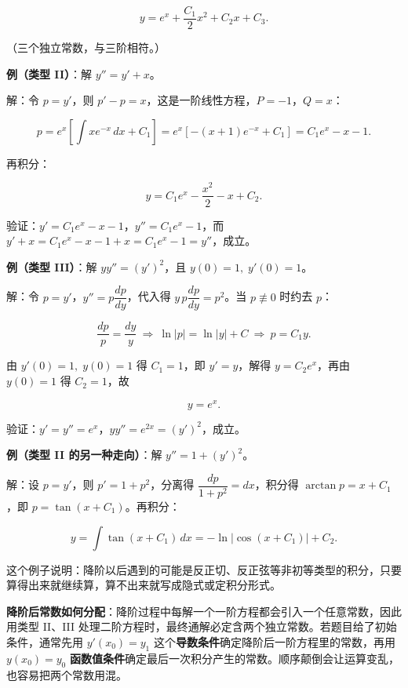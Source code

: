 \documentclass[11pt,openany,UTF8]{ctexbook}
\begin{document}
\[y=e^{x}+\frac{C_1}{2}x^{2}+C_2x+C_3 .\]

（三个独立常数，与三阶相符。）

\textbf{例（类型 II）}：解 $y''=y'+x$。

解：令 $p=y'$，则 $p'-p=x$，这是一阶线性方程，$P=-1$，$Q=x$：

\[p=e^{x}\left[\int xe^{-x}\,dx+C_1\right]=e^{x}\left[-(x+1)e^{-x}+C_1\right]=C_1e^{x}-x-1 .\]

再积分：

\[y=C_1e^{x}-\frac{x^{2}}{2}-x+C_2 .\]

验证：$y'=C_1e^{x}-x-1$，$y''=C_1e^{x}-1$，而 $y'+x=C_1e^{x}-x-1+x=C_1e^{x}-1=y''$，成立。

\textbf{例（类型 III）}：解 $yy''=(y')^{2}$，且 $y(0)=1,\;y'(0)=1$。

解：令 $p=y'$，$y''=p\dfrac{dp}{dy}$，代入得 $y\,p\dfrac{dp}{dy}=p^{2}$。当 $p\not\equiv 0$ 时约去 $p$：

\[\frac{dp}{p}=\frac{dy}{y}\ \Longrightarrow\ \ln\vert p\vert=\ln\vert y\vert+C\ \Longrightarrow\ p=C_1y .\]

由 $y'(0)=1,\;y(0)=1$ 得 $C_1=1$，即 $y'=y$，解得 $y=C_2e^{x}$，再由 $y(0)=1$ 得 $C_2=1$，故

\[y=e^{x}.\]

验证：$y'=y''=e^{x}$，$yy''=e^{2x}=(y')^{2}$，成立。

\textbf{例（类型 II 的另一种走向）}：解 $y''=1+(y')^{2}$。

解：设 $p=y'$，则 $p'=1+p^{2}$，分离得 $\dfrac{dp}{1+p^{2}}=dx$，积分得 $\arctan p=x+C_1$，即 $p=\tan(x+C_1)$。再积分：

\[y=\int\tan(x+C_1)\,dx=-\ln\vert\cos(x+C_1)\vert+C_2 .\]

这个例子说明：降阶以后遇到的可能是反正切、反正弦等非初等类型的积分，只要算得出来就继续算，算不出来就写成隐式或定积分形式。

\textbf{降阶后常数如何分配}：降阶过程中每解一个一阶方程都会引入一个任意常数，因此用类型 II、III 处理二阶方程时，最终通解必定含两个独立常数。若题目给了初始条件，通常先用 $y'(x_0)=y_1$ 这个\textbf{导数条件}确定降阶后一阶方程里的常数，再用 $y(x_0)=y_0$ \textbf{函数值条件}确定最后一次积分产生的常数。顺序颠倒会让运算变乱，也容易把两个常数用混。
\end{document}
